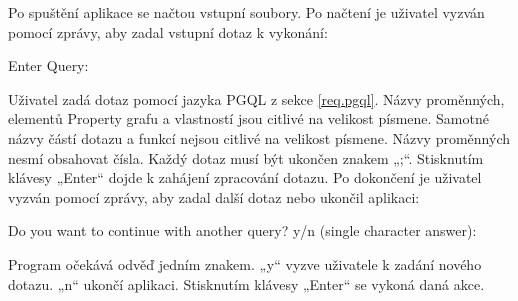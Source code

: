 Po spuštění aplikace se načtou vstupní soubory.
Po načtení je uživatel vyzván pomocí zprávy, aby zadal vstupní dotaz k vykonání:
\begin{code}
Enter Query:
\end{code}
Uživatel zadá dotaz pomocí jazyka PGQL z sekce \ref{req.pgql}.
Názvy proměnných, elementů Property grafu a vlastností jsou citlivé na velikost písmene.
Samotné názvy částí dotazu a funkcí nejsou citlivé na velikost písmene.
Názvy proměnných nesmí obsahovat čísla.
Každý dotaz musí být ukončen znakem „;“.
Stisknutím klávesy „Enter“ dojde k zahájení zpracování dotazu.
Po dokončení je uživatel vyzván pomocí zprávy, aby zadal další dotaz nebo ukončil aplikaci:
\begin{code}
Do you want to continue with another query?
    y/n (single character answer):
\end{code}
Program očekává odvěď jedním znakem.
„y“ vyzve uživatele k zadání nového dotazu.
„n“ ukončí aplikaci.
Stisknutím klávesy „Enter“ se vykoná daná akce.

